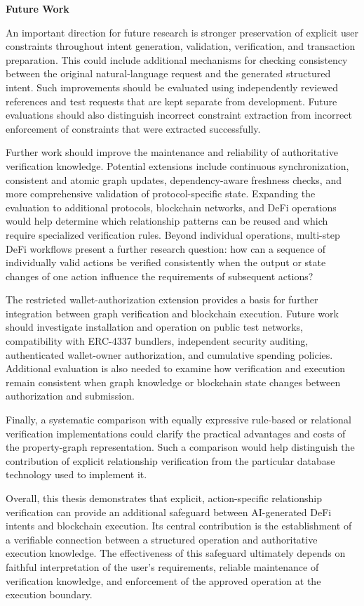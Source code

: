 \medskip
\noindent\textbf{Future Work}

An important direction for future research is stronger
preservation of explicit user constraints throughout
intent generation, validation, verification, and
transaction preparation. This could include additional
mechanisms for checking consistency between the original
natural-language request and the generated structured
intent. Such improvements should be evaluated using
independently reviewed references and test requests
that are kept separate from development. Future
evaluations should also distinguish incorrect constraint
extraction from incorrect enforcement of constraints
that were extracted successfully.

Further work should improve the maintenance and
reliability of authoritative verification knowledge.
Potential extensions include continuous synchronization,
consistent and atomic graph updates, dependency-aware
freshness checks, and more comprehensive validation
of protocol-specific state. Expanding the evaluation
to additional protocols, blockchain networks, and
DeFi operations would help determine which relationship
patterns can be reused and which require specialized
verification rules. Beyond individual operations,
multi-step DeFi workflows present a further research
question: how can a sequence of individually valid
actions be verified consistently when the output
or state changes of one action influence the
requirements of subsequent actions?

The restricted wallet-authorization extension provides
a basis for further integration between graph verification
and blockchain execution. Future work should investigate
installation and operation on public test networks,
compatibility with ERC-4337 bundlers, independent security
auditing, authenticated wallet-owner authorization, and
cumulative spending policies. Additional evaluation is
also needed to examine how verification and execution
remain consistent when graph knowledge or blockchain
state changes between authorization and submission.

Finally, a systematic comparison with equally expressive
rule-based or relational verification implementations
could clarify the practical advantages and costs of
the property-graph representation. Such a comparison
would help distinguish the contribution of explicit
relationship verification from the particular database
technology used to implement it.

Overall, this thesis demonstrates that explicit,
action-specific relationship verification can provide
an additional safeguard between AI-generated DeFi
intents and blockchain execution. Its central contribution
is the establishment of a verifiable connection between
a structured operation and authoritative execution
knowledge. The effectiveness of this safeguard ultimately
depends on faithful interpretation of the user's
requirements, reliable maintenance of verification
knowledge, and enforcement of the approved operation
at the execution boundary.
